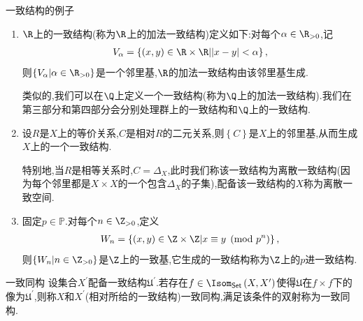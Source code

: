 \begin{example}{一致结构的例子}{}
	\begin{enumerate}
		\item $\R$上的一致结构(称为$\R$上的加法一致结构)定义如下:对每个$\alpha\in\R_{>0}$,记
		\begin{align*}
			V_{\alpha}=\left\{\left(x,y\right)\in\R\times\R\middle|\left|x-y\right|<\alpha\right\},
		\end{align*}
		则$\left\{V_{\alpha}\middle|\alpha\in\R_{>0}\right\}$是一个邻里基,$\R$的加法一致结构由该邻里基生成.
		
		类似的,我们可以在$\Q$上定义一个一致结构(称为$\Q$上的加法一致结构).我们在第三部分和第四部分会分别处理群上的一致结构和$\Q$上的一致结构.
		\item 设$R$是$X$上的等价关系,$C$是相对$R$的二元关系,则$\left\{C\right\}$是$X$上的邻里基,从而生成$X$上的一个一致结构.
		
		特别地,当$R$是相等关系时,$C=\Delta_{X}$,此时我们称该一致结构为离散一致结构(因为每个邻里都是$X\times X$的一个包含$\Delta_{X}$的子集),配备该一致结构的$X$称为离散一致空间.
		\item 固定$p\in\mathbb{P}$.对每个$n\in\Z_{>0}$,定义
		\begin{align*}
			W_{n}=\left\{\left(x,y\right)\in\Z\times\Z\middle|x\equiv y\pmod{p^{n}}\right\},
		\end{align*}
		则$\left\{W_{n}\middle|n\in\Z_{>0}\right\}$是$\Z$上的一致基,它生成的一致结构称为$\Z$上的$p$进一致结构.
	\end{enumerate}
\end{example}

\begin{definition}{一致同构}{}
	设集合$X^{\prime}$配备一致结构$\mathfrak{U}^{\prime}$.若存在$f\in\Isom_{\mathsf{Set}}\left(X,X^{\prime}\right)$使得$\mathfrak{U}$在$f\times f$下的像为$\mathfrak{U}^{\prime}$,则称$X$和$X^{\prime}$(相对所给的一致结构)一致同构,满足该条件的双射称为一致同构.
\end{definition}

